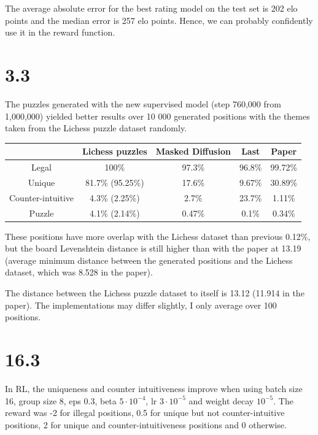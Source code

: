 \documentclass[a4paper, 12pt]{article}
\begin{document}
The average absolute error for the best rating model on the test set is 202 elo points and the median error is 257 elo points. Hence, we can probably confidently use it in the reward function.

\section{3.3}

The puzzles generated with the new supervised model (step 760,000 from 1,000,000) yielded better results over 10 000 generated positions with the themes taken from the Lichess puzzle dataset randomly.

\begin{table}[h]
    \centering
    \begin{tabular}{|c|c|c|c|c|}
        \hline
        & Lichess puzzles & Masked Diffusion & Last & Paper \\
        \hline
        Legal & 100\% & 97.3\% & 96.8\% & 99.72\%\\
        \hline
        Unique & 81.7\% (95.25\%) & 17.6\% & 9.67\% & 30.89\%\\
        \hline
        Counter-intuitive & 4.3\% (2.25\%) & 2.7\% & 23.7\% & 1.11\%\\
        \hline
        Puzzle & 4.1\% (2.14\%) & 0.47\% & 0.1\% & 0.34\%\\
        \hline
    \end{tabular}
\end{table}

These positions have more overlap with the Lichess dataset than previous 0.12\%, but the board Levenshtein distance is still higher than with the paper at 13.19 (average minimum distance between the generated positions and the Lichess dataset, which was 8.528 in the paper).

The distance between the Lichess puzzle dataset to itself is 13.12 (11.914 in the paper). The implementations may differ slightly, I only average over 100 positions.

\section{16.3}

In RL, the uniqueness and counter intuitiveness improve when using batch size 16, group size 8, eps 0.3, beta $5\cdot 10^{-4}$, lr $3\cdot 10^{-5}$ and weight decay $10^{-5}$. The reward was -2 for illegal positions, 0.5 for unique but not counter-intuitive positions, 2 for unique and counter-intuitiveness positions and 0 otherwise.
\end{document}

